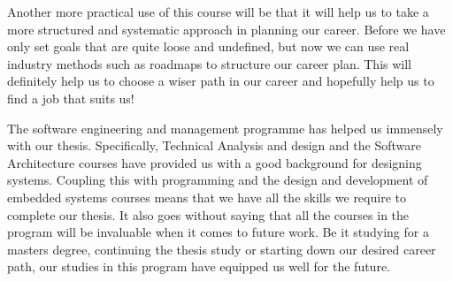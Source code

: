 \documentclass{article}
\begin{document}
Another more practical use of this course will be that it will help us to take a more structured and systematic approach in planning our career. Before we have only set goals that are quite loose and undefined, but now we can use real industry methods such as roadmaps to structure our career plan. This will definitely help us to choose a wiser path in our career and hopefully help us to find a job that suits us! 

The software engineering and management programme has helped us immensely with our thesis. Specifically, Technical Analysis and design and the Software Architecture courses have provided us with a good background for designing systems. Coupling this with programming and the design and development of embedded systems courses means that we have all the skills we require to complete our thesis. It also goes without saying that all the courses in the program will be invaluable when it comes to future work. Be it studying for a masters degree, continuing the thesis study or starting down our desired career path, our studies in this program have equipped us well for the future.





\end{document}
